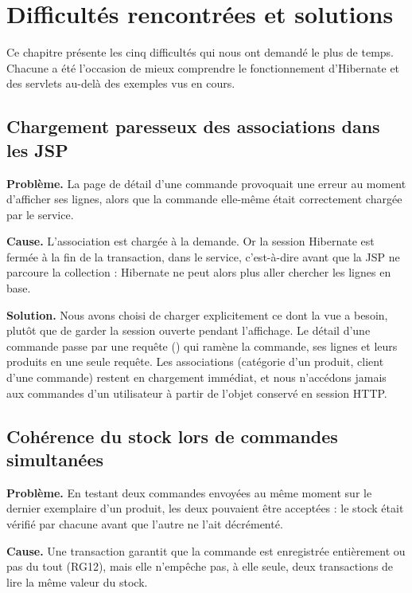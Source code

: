 \chapter{Difficultés rencontrées et solutions}

Ce chapitre présente les cinq difficultés qui nous ont demandé le plus de temps. Chacune a été l'occasion de
mieux comprendre le fonctionnement d'Hibernate et des servlets au-delà des exemples vus en cours.

\section{Chargement paresseux des associations dans les JSP}

\textbf{Problème.} La page de détail d'une commande provoquait une erreur au moment d'afficher ses lignes,
alors que la commande elle-même était correctement chargée par le service.

\textbf{Cause.} L'association  est chargée à la demande. Or la session Hibernate est
fermée à la fin de la transaction, dans le service, c'est-à-dire avant que la JSP ne parcoure la collection :
Hibernate ne peut alors plus aller chercher les lignes en base.

\textbf{Solution.} Nous avons choisi de charger explicitement ce dont la vue a besoin, plutôt que de garder la
session ouverte pendant l'affichage. Le détail d'une commande passe par une requête 
() qui ramène la commande, ses lignes et leurs produits en une seule
requête. Les associations  (catégorie d'un produit, client d'une commande) restent en
chargement immédiat, et nous n'accédons jamais aux commandes d'un utilisateur à partir de l'objet conservé en
session HTTP.

\section{Cohérence du stock lors de commandes simultanées}

\textbf{Problème.} En testant deux commandes envoyées au même moment sur le dernier exemplaire d'un produit,
les deux pouvaient être acceptées : le stock était vérifié par chacune avant que l'autre ne l'ait décrémenté.

\textbf{Cause.} Une transaction garantit que la commande est enregistrée entièrement ou pas du tout (RG12),
mais elle n'empêche pas, à elle seule, deux transactions de lire la même valeur du stock.

